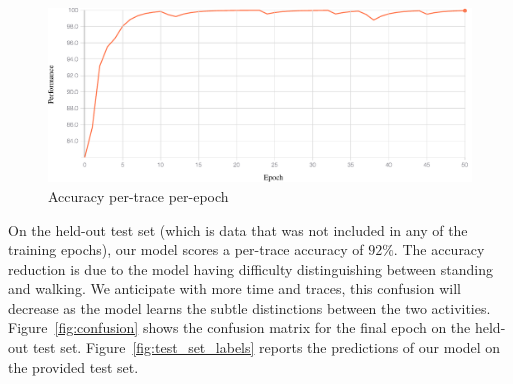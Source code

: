 \documentclass{article}
\begin{document}
\begin{figure}[h]
    \centering
    \includegraphics[width=\linewidth]{figures/performance_plot.pdf}
    \caption{Accuracy per-trace per-epoch \label{fig:acc_ptpe}}
\end{figure}

On the held-out test set (which is data that was not included in any of the training epochs), 
our model scores a per-trace accuracy of $92\%$. The accuracy reduction is due to the 
model having difficulty distinguishing between standing and walking. We anticipate with 
more time and traces, this confusion will decrease as the model learns the subtle distinctions 
between the two activities. Figure~\ref{fig:confusion} shows the confusion matrix for the 
final epoch on the held-out test set. Figure~\ref{fig:test_set_labels} reports the predictions
of our model on the provided test set.
\end{document}
